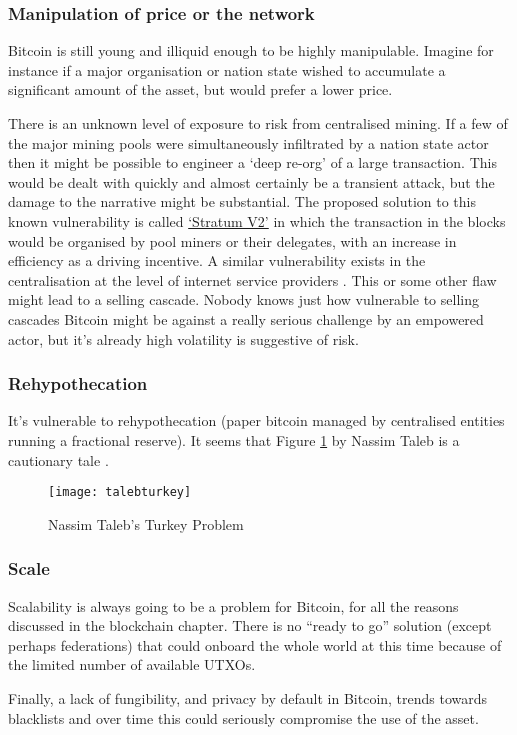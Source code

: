 \begin{itemize}
\subsubsection{Manipulation of price or the network}
Bitcoin is still young and illiquid enough to be highly manipulable. Imagine for instance if a major organisation or nation state wished to accumulate a significant amount of the asset, but would prefer a lower price. \par%
There is an unknown level of exposure to risk from centralised mining. If a few of the major mining pools were simultaneously infiltrated by a nation state actor then it might be possible to engineer a `deep re-org' of a large transaction. This would be dealt with quickly and almost certainly be a transient attack, but the damage to the narrative might be substantial. The proposed solution to this known vulnerability is called \href{https://braiins.com/stratum-v2}{`Stratum V2'} in which the transaction in the blocks would be organised by pool miners or their delegates, with an increase in efficiency as a driving incentive. A similar vulnerability exists in the centralisation at the level of internet service providers \cite{apostolaki2017hijacking}. This or some other flaw might lead to a selling cascade. Nobody knows just how vulnerable to selling cascades Bitcoin might be against a really serious challenge by an empowered actor, but it's already high volatility is suggestive of risk. 
\subsubsection{Rehypothecation}
It's vulnerable to rehypothecation (paper bitcoin managed by centralised entities running a fractional reserve). It seems that Figure \ref{fig:talebturkey} by  Nassim Taleb is a cautionary tale \cite{taleb2012antifragile}.
\begin{figure}
  \centering
    \texttt{[image: talebturkey]}
  \caption{Nassim Taleb's Turkey Problem}
  \label{fig:talebturkey}
\end{figure}
\subsubsection{Scale}
Scalability is always going to be a problem for Bitcoin, for all the reasons discussed in the blockchain chapter. There is no ``ready to go'' solution (except perhaps federations) that could onboard the whole world at this time because of the limited number of available UTXOs.\par 
Finally, a lack of fungibility, and privacy by default in Bitcoin, trends towards blacklists and over time this could seriously compromise the use of the asset. 

\end{itemize}
